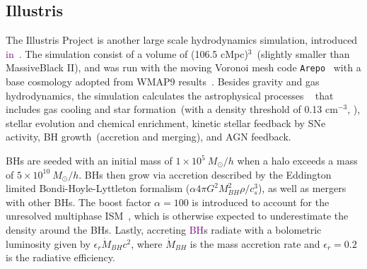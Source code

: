 \documentclass[twocolumn]{aastex631}
\newcommand{\red}[1]{\textcolor{purple}{#1}}
\begin{document}
\subsection{Illustris}
The Illustris Project is another large scale hydrodynamics simulation, introduced \red{in~\citet{Genel2014, 2014MNRAS.444.1518V, 2014Natur.509..177V, Sijacki2015, Nelson2015}.} The simulation consist of a volume of (106.5 cMpc)$^3$~(slightly smaller than MassiveBlack II), 
and was run with the moving Voronoi mesh code {\tt Arepo}~\citep{2010MNRAS.401..791S} with a base cosmology adopted from WMAP9 results~\citep{2013ApJS..208...19H}. Besides gravity and gas hydrodynamics, the simulation calculates the astrophysical processes ~\citep{2013MNRAS.436.3031V, 2014MNRAS.438.1985T} that includes gas cooling and star formation~(with a density threshold of 0.13 cm$^{-3}$, \citealt{2003MNRAS.339..289S}), stellar evolution and chemical enrichment, kinetic stellar feedback by SNe activity, BH growth~(accretion and merging), and AGN feedback.

BHs are seeded with an initial mass of $1 \times 10^5~M_{\odot}/h$ when a halo exceeds a mass of $5 \times 10^{10}~M_{\odot}/h$. BHs then grow via accretion described by the Eddington limited Bondi-Hoyle-Lyttleton formalism ($\alpha4\pi G^2M_{BH}^2 \rho/c_s^3$), as well as mergers with other BHs. The boost factor $\alpha=100$ is introduced to account for the unresolved multiphase ISM~\citep{Springel2005, 2009MNRAS.398...53B}, which is otherwise expected to underestimate the density around the BHs. Lastly, accreting \red{BH}s radiate with a bolometric luminosity given by $\epsilon_r \dot{M}_{BH}c^2$, where $\dot{M}_{BH}$ is the mass accretion rate and $\epsilon_r=0.2$ is the radiative efficiency.
\end{document}

